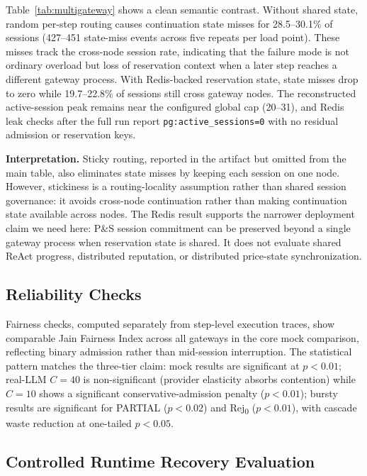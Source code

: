 \documentclass[sigconf,review,anonymous]{acmart}
\begin{document}
Table~\ref{tab:multigateway} shows a clean semantic contrast.
Without shared state, random per-step routing causes continuation state misses for 28.5--30.1\% of sessions (427--451 state-miss events across five repeats per load point).
These misses track the cross-node session rate, indicating that the failure mode is not ordinary overload but loss of reservation context when a later step reaches a different gateway process.
With Redis-backed reservation state, state misses drop to zero while 19.7--22.8\% of sessions still cross gateway nodes.
The reconstructed active-session peak remains near the configured global cap (20--31), and Redis leak checks after the full run report \texttt{pg:active\_sessions=0} with no residual admission or reservation keys.

\textbf{Interpretation.}
Sticky routing, reported in the artifact but omitted from the main table, also eliminates state misses by keeping each session on one node.
However, stickiness is a routing-locality assumption rather than shared session governance: it avoids cross-node continuation rather than making continuation state available across nodes.
The Redis result supports the narrower deployment claim we need here: P\&S session commitment can be preserved beyond a single gateway process when reservation state is shared.
It does not evaluate shared ReAct progress, distributed reputation, or distributed price-state synchronization.

\subsection{Reliability Checks}
\label{sec:fairness}
\label{sec:stats}

Fairness checks, computed separately from step-level execution traces, show comparable Jain Fairness Index across all gateways in the core mock comparison, reflecting binary admission rather than mid-session interruption. The statistical pattern matches the three-tier claim: mock results are significant at $p{<}0.01$; real-LLM $C{=}40$ is non-significant (provider elasticity absorbs contention) while $C{=}10$ shows a significant conservative-admission penalty ($p{<}0.01$); bursty results are significant for PARTIAL ($p{<}0.02$) and Rej\textsubscript{0} ($p{<}0.01$), with cascade waste reduction at one-tailed $p{<}0.05$.

\subsection{Controlled Runtime Recovery Evaluation}
\label{sec:recovery-eval}
\end{document}
